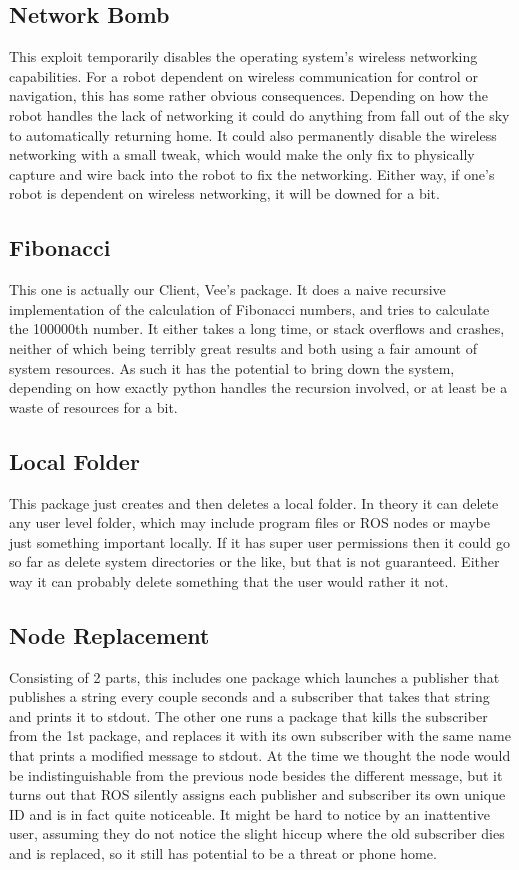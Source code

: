 \documentclass[IEEEtran,letterpaper,10pt,notitlepage,draftclsnofoot,onecolumn]{article}
\begin{document}
\subsection{Network Bomb}
This exploit temporarily disables the operating system's wireless networking capabilities.
For a robot dependent on wireless communication for control or navigation, this has some rather obvious consequences.
Depending on how the robot handles the lack of networking it could do anything from fall out of the sky to automatically
returning home. It could also permanently disable the wireless networking with a small tweak, which would make the only 
fix to physically capture and wire back into the robot to fix the networking. 
Either way, if one's robot is dependent on wireless networking, it will be downed for a bit.

\subsection{Fibonacci}
This one is actually our Client, Vee's package. It does a naive recursive implementation of the calculation of Fibonacci
numbers, and tries to calculate the 100000th number. It either takes a long time, or stack overflows and crashes, neither 
of which being terribly great results and both using a fair amount of system resources. As such it has the potential to 
bring down the system, depending on how exactly python handles the recursion involved, or at least be a waste of resources 
for a bit.

\subsection{Local Folder}
This package just creates and then deletes a local folder. In theory it can delete any user level folder, which may include
program files or ROS nodes or maybe just something important locally. If it has super user permissions then it could go so
far as delete system directories or the like, but that is not guaranteed. Either way it can probably delete something that
the user would rather it not.

\subsection{Node Replacement}
Consisting of 2 parts, this includes one package which launches a publisher that publishes a string every couple seconds and a 
subscriber that takes that string and prints it to stdout.
The other one runs a package that kills the subscriber from the 1st package, and replaces it with its own subscriber with the 
same name that prints a modified message to stdout.
At the time we thought the node would be indistinguishable from the previous node besides the different message, but it turns 
out that ROS silently assigns each publisher and subscriber its own unique ID and is in fact quite noticeable.
It might be hard to notice by an inattentive user, assuming they do not notice the slight hiccup where the old subscriber dies 
and is replaced, so it still has potential to be a threat or phone home.
\end{document}
